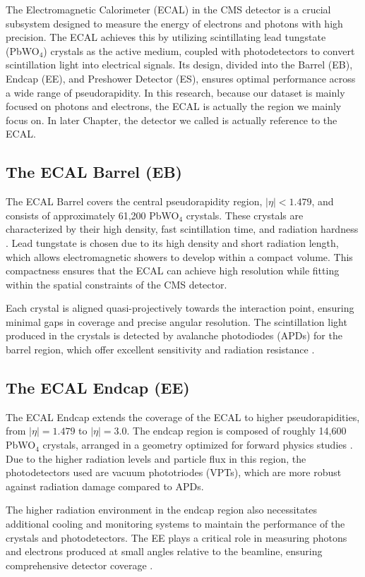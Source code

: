 The Electromagnetic Calorimeter (ECAL) in the CMS detector is a crucial subsystem designed to measure the energy of electrons and photons with high precision. The ECAL achieves this by utilizing scintillating lead tungstate (PbWO$_4$) crystals as the active medium, coupled with photodetectors to convert scintillation light into electrical signals. Its design, divided into the Barrel (EB), Endcap (EE), and Preshower Detector (ES), ensures optimal performance across a wide range of pseudorapidity. In this research, because our dataset is mainly focused on photons and electrons, the ECAL is actually the region we mainly focus on. In later Chapter, the detector we called is actually reference to the ECAL.

\subsection{The ECAL Barrel (EB)}
The ECAL Barrel covers the central pseudorapidity region, $|\eta| < 1.479$, and consists of approximately 61,200 PbWO$_4$ crystals. These crystals are characterized by their high density, fast scintillation time, and radiation hardness \cite{ecal_tdr}. Lead tungstate is chosen due to its high density and short radiation length, which allows electromagnetic showers to develop within a compact volume. This compactness ensures that the ECAL can achieve high resolution while fitting within the spatial constraints of the CMS detector.

Each crystal is aligned quasi-projectively towards the interaction point, ensuring minimal gaps in coverage and precise angular resolution. The scintillation light produced in the crystals is detected by avalanche photodiodes (APDs) for the barrel region, which offer excellent sensitivity and radiation resistance \cite{ecal_tdr}.

\subsection{The ECAL Endcap (EE)}
The ECAL Endcap extends the coverage of the ECAL to higher pseudorapidities, from $|\eta| = 1.479$ to $|\eta| = 3.0$. The endcap region is composed of roughly 14,600 PbWO$_4$ crystals, arranged in a geometry optimized for forward physics studies \cite{ecal_tdr}. Due to the higher radiation levels and particle flux in this region, the photodetectors used are vacuum phototriodes (VPTs), which are more robust against radiation damage compared to APDs.

The higher radiation environment in the endcap region also necessitates additional cooling and monitoring systems to maintain the performance of the crystals and photodetectors. The EE plays a critical role in measuring photons and electrons produced at small angles relative to the beamline, ensuring comprehensive detector coverage \cite{ecal_tdr}.

